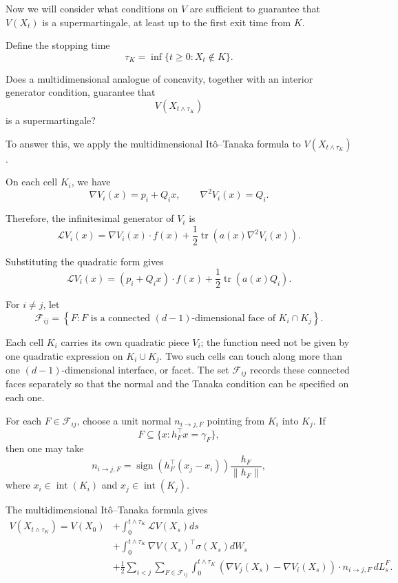 Now we will consider what conditions on $V$ are sufficient to guarantee that
$V(X_t)$ is a supermartingale, at least up to the first exit time from $K$.

Define the stopping time
\[
\tau_K = \inf\{t \geq 0 : X_t \notin K\}.
\]

\begin{hypothesis}
Does a multidimensional analogue of concavity, together with an interior
generator condition, guarantee that
\[
V(X_{t \wedge \tau_K})
\]
is a supermartingale?
\end{hypothesis}

To answer this, we apply the multidimensional Itô--Tanaka formula to
$V(X_{t \wedge \tau_K})$.

On each cell $K_i$, we have
\[
\nabla V_i(x) = p_i + Q_i x,
\qquad
\nabla^2 V_i(x) = Q_i.
\]

Therefore, the infinitesimal generator of $V_i$ is
\[
\mathcal{L}V_i(x)
=
\nabla V_i(x) \cdot f(x)
+
\frac{1}{2}
\operatorname{tr}\!\left(a(x)\nabla^2 V_i(x)\right).
\]

Substituting the quadratic form gives
\[
\mathcal{L}V_i(x)
=
(p_i + Q_i x)\cdot f(x)
+
\frac{1}{2}\operatorname{tr}\!\left(a(x)Q_i\right).
\]

For $i\neq j$, let
\[
  \mathcal F_{ij}
  =
  \left\{
    F:
    F \text{ is a connected }(d-1)\text{-dimensional face of }
    K_i\cap K_j
  \right\}.
\]

\begin{sidenote}
Each cell $K_i$ carries its own quadratic piece $V_i$; the function need not be
given by one quadratic expression on $K_i\cup K_j$. Two such cells can touch
along more than one $(d-1)$-dimensional interface, or facet. The set
$\mathcal F_{ij}$ records these connected faces separately so that the normal
and the Tanaka condition can be specified on each one.
\end{sidenote}

For each $F\in\mathcal F_{ij}$, choose a unit normal
$n_{i\to j,F}$ pointing from $K_i$ into $K_j$. If
\[
  F\subseteq \{x:h_F^\top x=\gamma_F\},
\]
then one may take
\[
  n_{i\to j,F}
  =
  \operatorname{sign}\!\left(h_F^\top(x_j-x_i)\right)
  \frac{h_F}{\|h_F\|},
\]
where $x_i\in\operatorname{int}(K_i)$ and
$x_j\in\operatorname{int}(K_j)$.

The multidimensional Itô--Tanaka formula gives
\begin{align}
V(X_{t \wedge \tau_K})
=
V(X_0)
&+
\int_0^{t \wedge \tau_K}
\mathcal{L}V(X_s) ds \\
&+
\int_0^{t \wedge \tau_K}
\nabla V(X_s)^\top \sigma(X_s) dW_s \\
&+
\frac{1}{2}
\sum_{i<j}
\sum_{F\in\mathcal F_{ij}}
\int_0^{t \wedge \tau_K}
\left(
\nabla V_j(X_s) - \nabla V_i(X_s)
\right)\cdot n_{i\to j,F}\,
dL_s^F .
\end{align}

